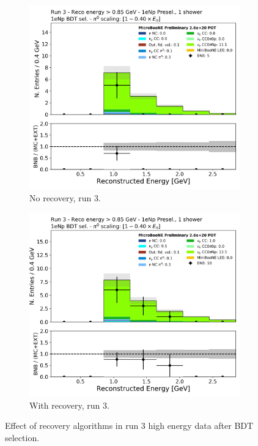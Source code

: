 \begin{figure}[H]
    \centering
    \begin{subfigure}{0.35\textwidth}
    \includegraphics[width=1.00\textwidth]{Sidebands/Figures/CutUpdates/reco_e_coarse_run3_norecovery.png}
    \caption{No recovery, run 3.}
    \end{subfigure}
    \begin{subfigure}{0.35\textwidth}
    \includegraphics[width=1.00\textwidth]{Sidebands/Figures/CutUpdates/reco_e_coarse_run3_recovery.png}
    \caption{With recovery, run 3.}
    \end{subfigure}
    \caption{Effect of recovery algorithms in run 3 high energy \npsel data after BDT selection.}
    \label{run3recovery}
\end{figure}

